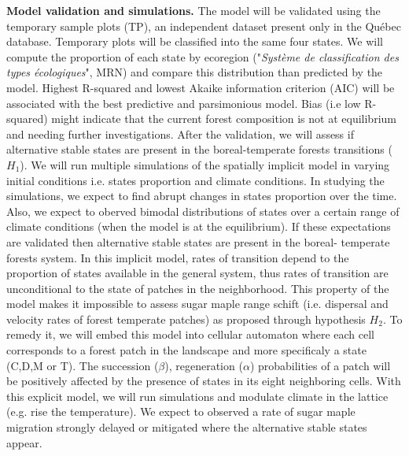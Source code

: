 \textbf{Model validation and simulations.}  The model will be validated using
the temporary sample plots (TP), an independent dataset present only in the
Québec database. Temporary plots will be classified into the same four states.
We will compute the proportion of each state by ecoregion ("\textit{Système de
classification des types écologiques}", MRN) and compare this distribution
than predicted by the model.  Highest R-squared and lowest Akaike information
criterion (AIC) will be associated with the best predictive and parsimonious
model. Bias (i.e low R-squared) might indicate that the current forest
composition is not at equilibrium and needing further investigations. After
the validation, we will assess if alternative stable states are present in the
boreal-temperate forests transitions ($H_1$). We will run multiple simulations
of the spatially implicit model in varying initial conditions i.e. states
proportion and climate conditions. In studying the simulations, we expect to
find abrupt changes in states proportion over the time. Also, we expect to
oberved bimodal distributions of states over a certain range of climate
conditions (when the model is at the equilibrium). If these expectations are
validated then alternative stable states are present in the boreal- temperate
forests system.  In this implicit model, rates of transition depend to the
proportion of states available in the general system, thus rates of transition
are unconditional to the state of patches in the neighborhood. This property
of the model makes it impossible to assess sugar maple range schift (i.e.
dispersal and velocity rates of forest temperate patches) as proposed through
hypothesis $H_2$. To remedy it, we will embed this model into cellular
automaton where each cell corresponds to a forest patch in the landscape and
more specificaly a state (C,D,M or T). The succession ($\beta$), regeneration
($\alpha$) probabilities of a patch will be positively affected by the
presence of states in its eight neighboring cells.  With this explicit model,
we will run simulations and modulate climate in the lattice (e.g. rise the
temperature). We expect to observed a rate of sugar maple migration strongly
delayed or mitigated   where the alternative stable states appear.


\clearpage

